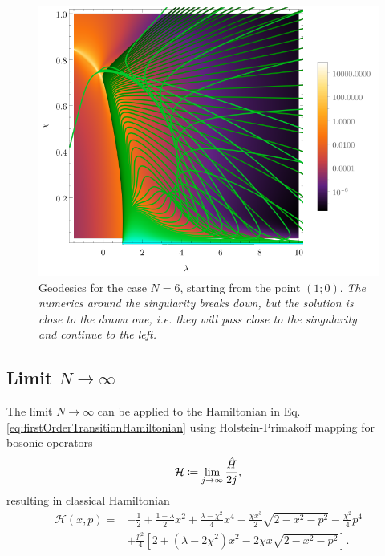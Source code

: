 \begin{figure}[H]
    \centering
    \includegraphics[scale=1.3]{../img/N=5_geods00.pdf}
    \caption{Geodesics for the case $N=6$, starting from the point $(1;0)$. \emph{The numerics around the singularity breaks down, but the solution is close to the drawn one, i.e. they will pass close to the singularity and continue to the left.}}
    \label{fig:geod10}    
\end{figure}







\subsection{Limit \texorpdfstring{$N\rightarrow \infty$}{N->infty}}
The limit $N\rightarrow \infty$ can be applied to the Hamiltonian in Eq. \ref{eq:firstOrderTransitionHamiltonian} using Holstein-Primakoff mapping for bosonic operators
\begin{equation}
    \mathcal{H}\coloneqq\lim_{j\rightarrow\infty}\frac{\hat{H}}{2j},
\end{equation}
resulting in classical Hamiltonian
\begin{equation}
    \begin{split}
        \mathcal{H}(x,p)=&-\frac{1}{2}+\frac{1-\lambda}{2}x^2+\frac{\lambda-\chi^2}{4}x^4-\frac{\chi x^3}{2}\sqrt{2-x^2-p^2}-\frac{\chi^2}{4}p^4\\
        &+\frac{p^2}{4}\left[2+(\lambda-2\chi^2)x^2-2\chi x\sqrt{2-x^2-p^2}\right].
    \end{split}
    \label{eq:HamiltonianClassicalLimit}
\end{equation}


